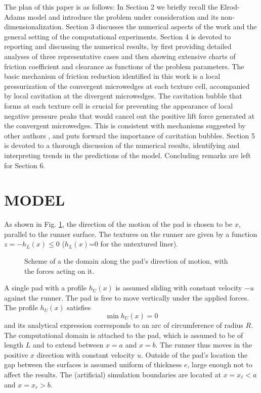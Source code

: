 The plan of this paper is as follows: In Section 2 we briefly
recall the Elrod-Adams model and introduce the problem under consideration
and its non-dimensionalization. Section 3 discusses the numerical
aspects of the work and the general setting of the computational
experiments. Section 4 is devoted to reporting and discussing the
numerical results, by first providing detailed analyses of three
representative cases and then showing extensive charts of
friction coefficient and clearance as functions of the
problem parameters. The basic mechanism
of friction reduction identified in this work is a local 
pressurization of the convergent
microwedges at each texture cell, accompanied by local cavitation
at the divergent microwedges. The cavitation bubble that forms
at each texture cell is crucial for preventing the appearance of
local negative pressure peaks that would cancel out the positive
lift force generated at the convergent microwedges. This is
consistent with mechanisms suggested by other authors 
\cite{fowell07,gad2012}, and puts forward
the importance of cavitation bubbles. 
Section 5 is devoted to a thorough discussion of the numerical
results, identifying and interpreting trends in the predictions
of the model. Concluding remarks are left for Section 6.

\section{MODEL}


As shown in Fig. \ref{fig:domain}, the direction of the motion of the pad is chosen to be $x$, parallel to the runner surface. 
The textures on the runner are given by a function $z=-h_L(x)\leq 0$ ($h_L(x)$=0 for the untextured liner).

\begin{figure}
    \begin{center}
	{\scalebox{1.0}{}}
   \end{center}
\caption{Scheme of a the domain along the pad's 
direction of motion, with the forces acting on it.}
\label{fig:domain}
\end{figure}


A single pad with a profile $h_U(x)$ is assumed sliding with constant
velocity $-u$ against the runner. The pad is free to move vertically under the
applied forces. The profile $h_U(x)$ 
satisfies 
$$\min h_U(x)=0$$ 
and its analytical expression corresponds to an arc of circumference 
of radius $R$. 
The computational domain is attached to the pad, which is assumed to be
of length $L$ and to extend between $x=a$ and $x=b$. The runner thus moves
in the positive $x$ direction with constant velocity $u$.
Outside of the pad's location the gap between 
the surfaces is assumed uniform of thickness $e$, large enough not to
affect the results. The (artificial)
simulation boundaries are located at $x=x_\ell<a$ and
$x=x_r > b$. 




